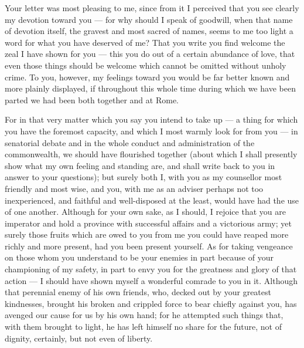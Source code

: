 

 Your letter was most pleasing to me, since from it I perceived that you see clearly my devotion toward you --- for why should I speak of goodwill, when that name of devotion itself, the gravest and most sacred of names, seems to me too light a word for what you have deserved of me? That you write you find welcome the zeal I have shown for you --- this you do out of a certain abundance of love, that even those things should be welcome which cannot be omitted without unholy crime. To you, however, my feelings toward you would be far better known and more plainly displayed, if throughout this whole time during which we have been parted we had been both together and at Rome.

 For in that very matter which you say you intend to take up --- a thing for which you have the foremost capacity, and which I most warmly look for from you --- in senatorial debate and in the whole conduct and administration of the commonwealth, we should have flourished together (about which I shall presently show what my own feeling and standing are, and shall write back to you in answer to your questions); but surely both I, with you as my counsellor most friendly and most wise, and you, with me as an adviser perhaps not too inexperienced, and faithful and well-disposed at the least, would have had the use of one another. Although for your own sake, as I should, I rejoice that you are imperator and hold a province with successful affairs and a victorious army; yet surely those fruits which are owed to you from me you could have reaped more richly and more present, had you been present yourself. As for taking vengeance on those whom you understand to be your enemies in part because of your championing of my safety, in part to envy you for the greatness and glory of that action --- I should have shown myself a wonderful comrade to you in it. Although that perennial enemy of his own friends, who, decked out by your greatest kindnesses, brought his broken and crippled force to bear chiefly against you, has avenged our cause for us by his own hand; for he attempted such things that, with them brought to light, he has left himself no share for the future, not of dignity, certainly, but not even of liberty.

